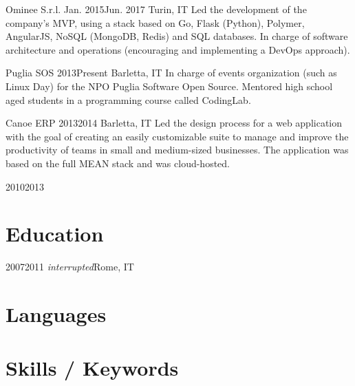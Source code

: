 \documentclass{resume}
\begin{document}
%
    {Ominee S.r.l.}%
    {Jan. 2015}{Jun. 2017}%
    {Turin, IT}%
    {Led the development of the company’s MVP, using a stack based on Go,
        Flask (Python), Polymer, AngularJS, NoSQL (MongoDB, Redis) and SQL
        databases. In charge of software architecture and operations
        (encouraging and implementing a DevOps approach).}

%
    {Puglia SOS}%
    {2013}{Present}%
    {Barletta, IT}%
    {In charge of events organization (such as Linux Day) for the NPO Puglia
        Software Open Source. Mentored high school aged students in a
        programming course called CodingLab.}

%
    {Canoe ERP}%
    {2013}{2014}%
    {Barletta, IT}%
    {Led the design process for a web application with the goal of creating an
        easily customizable suite to manage and improve the productivity of
        teams in small and medium-sized businesses.  The application was based
        on the full MEAN stack and was cloud-hosted.}

%
    {}%
    {2010}{2013}%
    {}{}

\section{Education}

%
    {2007}{2011 \lbrack \textit{interrupted}\rbrack}{Rome, IT}{}

\section{Languages}

\begin{languagessection}
\end{languagessection}

\section{Skills / Keywords}

\end{document}
